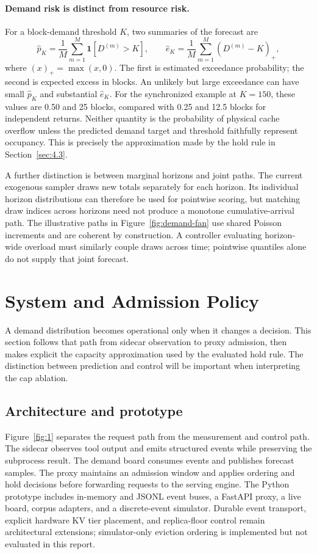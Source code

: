 \documentclass[11pt,a4paper]{article}
\begin{document}
\paragraph{Demand risk is distinct from resource risk.}
For a block-demand threshold \(K\), two summaries of the forecast are
\begin{equation}
\widehat p_K=\frac1M\sum_{m=1}^M\mathbf1[D^{(m)}>K],\qquad
\widehat e_K=\frac1M\sum_{m=1}^M(D^{(m)}-K)_+,
\label{eq:tail-risk}
\end{equation}
where \((x)_+=\max(x,0)\). The first is estimated exceedance probability; the second is expected excess in blocks. An unlikely but large exceedance can have small \(\widehat p_K\) and substantial \(\widehat e_K\). For the synchronized example at \(K=150\), these values are 0.50 and 25 blocks, compared with 0.25 and 12.5 blocks for independent returns. Neither quantity is the probability of physical cache overflow unless the predicted demand target and threshold faithfully represent occupancy. This is precisely the approximation made by the hold rule in Section~\ref{sec:4.3}.

A further distinction is between marginal horizons and joint paths. The current exogenous sampler draws new totals separately for each horizon. Its individual horizon distributions can therefore be used for pointwise scoring, but matching draw indices across horizons need not produce a monotone cumulative-arrival path. The illustrative paths in Figure~\ref{fig:demand-fan} use shared Poisson increments and are coherent by construction. A controller evaluating horizon-wide overload must similarly couple draws across time; pointwise quantiles alone do not supply that joint forecast.


\section{System and Admission Policy}
\label{sec:4}

A demand distribution becomes operational only when it changes a decision. This section follows that path from sidecar observation to proxy admission, then makes explicit the capacity approximation used by the evaluated hold rule. The distinction between prediction and control will be important when interpreting the cap ablation.
\subsection{Architecture and prototype}
\label{sec:4.1}
Figure~\ref{fig:1} separates the request path from the measurement and control path. The sidecar observes tool output and emits structured events while preserving the subprocess result. The demand board consumes events and publishes forecast samples. The proxy maintains an admission window and applies ordering and hold decisions before forwarding requests to the serving engine. The Python prototype includes in-memory and JSONL event buses, a FastAPI proxy, a live board, corpus adapters, and a discrete-event simulator. Durable event transport, explicit hardware KV tier placement, and replica-floor control remain architectural extensions; simulator-only eviction ordering is implemented but not evaluated in this report.
\end{document}
